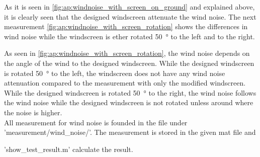 As it is seen in \autoref{fig:ap:windnoise_with_screen_on_ground} and explained above, it is clearly seen that the designed windscreen attenuate the wind noise. The next measurement \autoref{fig:ap:windnoise_with_screen_rotation} shows the differences in wind noise while the windscreen is ether rotated \SI{50}{\degree} to the left and to the right.  

As seen in \autoref{fig:ap:windnoise_with_screen_rotation}, the wind noise depends on the angle of the wind to the designed windscreen. While the designed windscreen is rotated \SI{50}{\degree} to the left, the windscreen does not have any wind noise attenuation compared to the measurement with only the modified windscreen. While the designed windscreen is rotated \SI{50}{\degree} to the right, the wind noise follows the wind noise while the designed windscreen is not rotated unless around  where the noise is  higher.   \\



All measurement for wind noise is founded in the file under 'measurement/wind_noise/'. The measurement is stored in the given mat file and 

'show_test_result.m' calculate the result.
